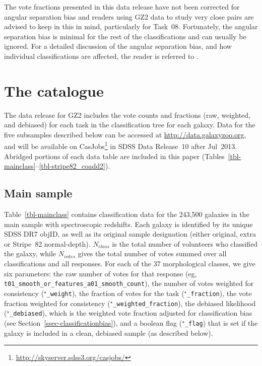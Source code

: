 \documentclass[useAMS,usenatbib]{mn2e}
\begin{document}
The vote fractions presented in this data release have not been corrected for angular separation bias and readers using GZ2 data to study very close pairs are advised to keep in this in mind, particularly for Task~08. Fortunately, the angular separation bias is minimal for the rest of the classifications and can usually be ignored. For a detailed discussion of the angular separation bias, and how individual classifications are affected, the reader is referred to \citet{cas13}.


\section{The catalogue} \label{sec-catalogue}


The data release for GZ2 includes the vote counts and fractions (raw, weighted, and debiased) for each task in the classification tree for each galaxy. Data for the five subsamples described below can be accessed at \url{http://data.galaxyzoo.org}, and will be available on CasJobs\footnote{\url{http://skyserver.sdss3.org/casjobs/}} in SDSS Data Release~10 after Jul~2013. Abridged portions of each data table are included in this paper (Tables~\ref{tbl-mainclass}--\ref{tbl-stripe82_coadd2}).

\subsection{Main sample}\label{ssec-catalogue_main}

Table~\ref{tbl-mainclass} contains classification data for the 243,500 galaxies in the main sample with spectroscopic redshifts. Each galaxy is identified by its unique SDSS DR7 objID, as well as its original sample designation (either original, extra or Stripe~82 normal-depth). $N_{class}$ is the total number of volunteers who classified the galaxy, while $N_{votes}$ gives the total number of votes summed over all classifications and all responses. For each of the 37 morphological classes, we give six parameters: the raw number of votes for that response (eg, {\tt t01\_smooth\_or\_features\_a01\_smooth\_count}), the number of votes weighted for consistency ({\tt $^\star$\_weight}), the fraction of votes for the task ({\tt $^\star$\_fraction}), the vote fraction weighted for consistency ({\tt $^\star$\_weighted\_fraction}), the debiased likelihood ({\tt $^\star$\_debiased}), which is the weighted vote fraction adjusted for classification bias (see Section~\ref{ssec-classificationbias}), and a boolean flag ({\tt $^\star$\_flag}) that is set if the galaxy is included in a clean, debiased sample (as described below).
\end{document}
